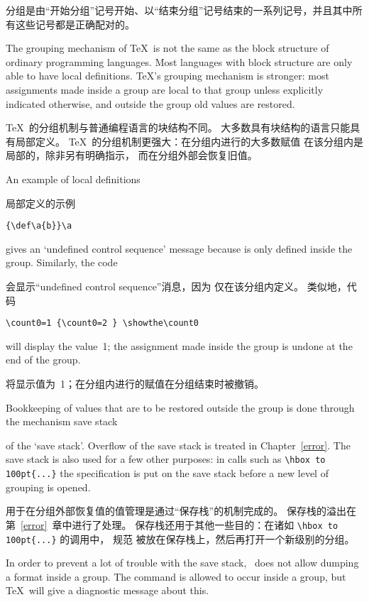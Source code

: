 分组是由“开始分组”记号开始、以“结束分组”记号结束的一系列记号，并且其中所有这些记号都是正确配对的。

The grouping mechanism of \TeX\ is not the same as
the block structure
of ordinary programming languages.
Most languages with block structure are only able  to have
local definitions. \TeX's grouping mechanism is stronger: 
most assignments made inside a group
are local to that group unless explicitly indicated otherwise,
and outside the group old values are restored.

\TeX\ 的分组机制与普通编程语言的块结构不同。
大多数具有块结构的语言只能具有局部定义。
\TeX\ 的分组机制更强大：在分组内进行的大多数赋值
在该分组内是局部的，除非另有明确指示，
而在分组外部会恢复旧值。

An example of local definitions

局部定义的示例
\begin{verbatim}
{\def\a{b}}\a
\end{verbatim}
gives an `undefined control sequence'
message because  is only defined inside the group.
Similarly, the code

会显示“undefined control sequence”消息，因为  仅在该分组内定义。
类似地，代码
\begin{verbatim}
\count0=1 {\count0=2 } \showthe\count0
\end{verbatim}
will display the value~1; the assignment made inside the group
is undone at the end of the group.

将显示值为~1；在分组内进行的赋值在分组结束时被撤销。

Bookkeeping of values that are to be restored outside the group
is done through the mechanism
\term save stack\par
of the `save stack'. Overflow of the save stack is treated
in Chapter~\ref{error}. The save stack is also used for
a few other purposes: in calls such as \hbox{\verb>\hbox to 100pt{...}>}
the specification \hbox{} is put on the save
stack before a new level of grouping is opened.

用于在分组外部恢复值的值管理是通过“保存栈”的机制完成的。
保存栈的溢出在第~\ref{error}~章中进行了处理。
保存栈还用于其他一些目的：在诸如 \hbox{\verb>\hbox to 100pt{...}>} 的调用中，
规范 \hbox{} 被放在保存栈上，然后再打开一个新级别的分组。

In order to prevent a lot of trouble with the save stack,
\IniTeX\ does not allow dumping a format inside a group.
The  command is allowed to occur inside a group,
but \TeX\ will give a diagnostic message about this.


